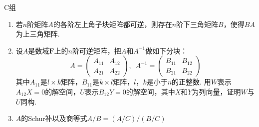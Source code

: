 \centerline{\heiti C组}
\begin{enumerate}
    \item 若$n$阶矩阵$A$的各阶左上角子块矩阵都可逆，则存在$n$阶下三角矩阵$B$，使得$BA$为上三角矩阵.

    \item 设$A$是数域$\mathbf{F}$上的$n$阶可逆矩阵，把$A$和$A^{-1}$做如下分块：
          \[A=\begin{pmatrix}
                  A_{11} & A_{12} \\ A_{21} & A_{22}
              \end{pmatrix},\enspace A^{-1}=\begin{pmatrix}
                  B_{11} & B_{12} \\ B_{21} & B_{22}
              \end{pmatrix}\]
          其中$A_{11}$是$l \times k$矩阵，$B_{11}$是$k \times l$矩阵，$l$，$k$是小于$n$的正整数. 用$W$表示$A_{12}X=0$的解空间，$U$表示$B_{12}Y=0$的解空间，其中$X$和$Y$为列向量，证明$W$与$U$同构.

    \item $A$的Schur补以及商等式$A/B=(A/C)/(B/C)$%
\end{enumerate}
